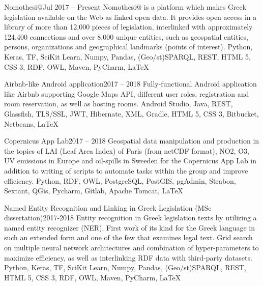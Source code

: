 
\begin{projects}
	\project
	{Nomothesi@}{Jul 2017 – Present}
	{}
	{Nomothesi@ is a platform which makes Greek legislation available on the Web as linked open data. It provides open access in a library of more than 12,000 pieces of legislation, interlinked with approximately 124,400 connections and over 8,000 unique entities, such as geospatial entities, persons, organizations and geographical landmarks (points of interest).}
	{Python, Keras, TF, SciKit Learn, Numpy, Pandas, (Geo/st)SPARQL, REST, HTML 5, CSS 3, RDF, OWL, Maven, PyCharm, \LaTeX}

	\project
	{Airbnb-like Android application}{2017 – 2018}
	{}
	{Fully-functional Android application like Airbnb supporting Google Maps API, different user roles, registration and room reservation, as well as hosting rooms.}
	{Android Studio, Java, REST, Glassfish, TLS/SSL, JWT, Hibernate, XML, Gradle, HTML 5, CSS 3, Bitbucket, Netbeans, \LaTeX}

	\project
	{Copernicus App Lab}{2017 – 2018}
	{}
	{Geospatial data manipulation and production in the topics of LAI (Leaf Area Index) of Paris (from netCDF format), NO2, O3, UV emissions in Europe and oil-spills in Sweeden for the Copernicus App Lab in addition to writing of scripts to automate tasks within the group and improve efficiency.}
	{Python, RDF, OWL, PostgreSQL, PostGIS, pgAdmin, Strabon, Sextant, QGis, Pycharm, Gitlab, Apache Tomcat, \LaTeX}

	\project
	{Named Entity Recognition and Linking in Greek Legislation (MSc dissertation)}{2017-2018}
	{}
	{Entity recognition in Greek legislation texts by utilizing a named entity recognizer (NER). First work of its kind for the Greek language in such an extended form and one of the few that examines legal text. Grid search on multiple neural network architectures and combination of hyper-parameters to maximize efficiency, as well as interlinking RDF data with third-party datasets.}
	{Python, Keras, TF, SciKit Learn, Numpy, Pandas, (Geo/st)SPARQL, REST, HTML 5, CSS 3, RDF, OWL, Maven, PyCharm, \LaTeX}


\end{projects}

